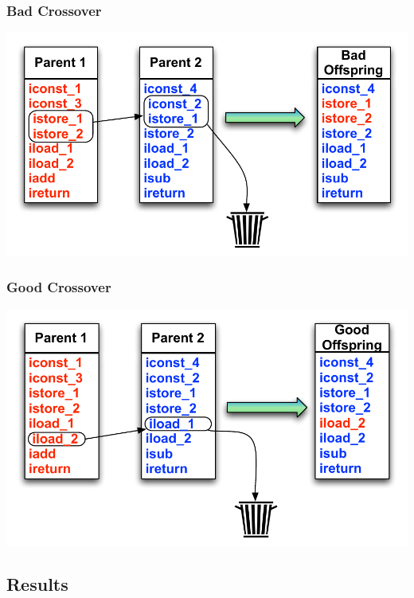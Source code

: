 \documentclass{beamer}
\begin{document}
\begin{frame}
  \frametitle{Bad Crossover}
  \includegraphics[height=.5\textheight]{Illustrations/badCrossover.pdf}
\end{frame}


\begin{frame}
  \frametitle{Good Crossover}
  \includegraphics[height=.5\textheight]{Illustrations/goodCrossover.pdf}
\end{frame}



\subsection[Results]{Results}
\end{document}
